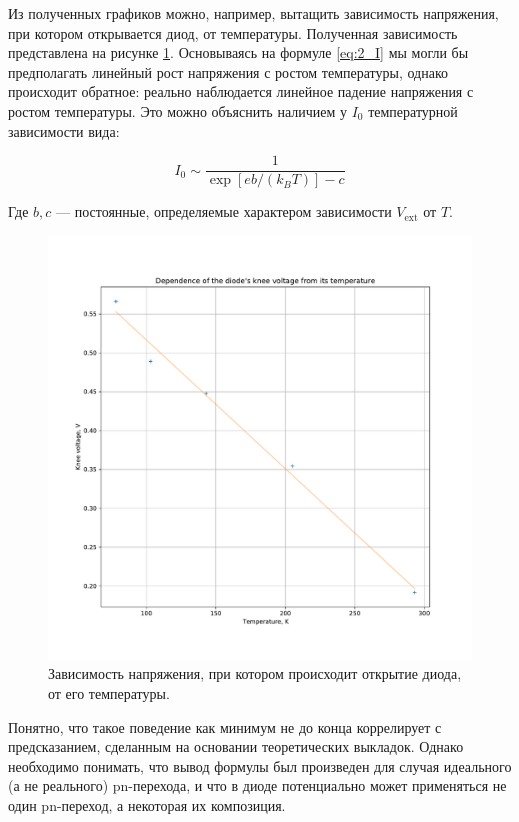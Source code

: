 \documentclass[a4paper, 12pt]{article}
\begin{document}
Из полученных графиков можно, например, вытащить зависимость напряжения, при котором открывается диод, от температуры. Полученная зависимость представлена на рисунке \ref{fig:2_Knee_Diode}. Основываясь на формуле \ref{eq:2_I} мы могли бы предполагать линейный рост напряжения с ростом температуры, однако происходит обратное: реально наблюдается линейное падение напряжения с ростом температуры. Это можно объяснить наличием у $I_0$ температурной зависимости вида:

\begin{equation}
	I_0 \sim \frac{1}{\exp[e b/(k_B T)] - c}
\end{equation}

Где $b, c$ --- постоянные, определяемые характером зависимости $V_{\text{ext}}$ от $T$.

\begin{figure}[H]
	\centering
	\includegraphics[width=\linewidth]{2_Knee_Diode}
	\caption{Зависимость напряжения, при котором происходит открытие диода, от его температуры.}
	\label{fig:2_Knee_Diode}
\end{figure}

Понятно, что такое поведение как минимум не до конца коррелирует с предсказанием, сделанным на основании теоретических выкладок. Однако необходимо понимать, что вывод формулы был произведен для случая идеального (а не реального) pn-перехода, и что в диоде потенциально может применяться не один pn-переход, а некоторая их композиция.
\end{document}
